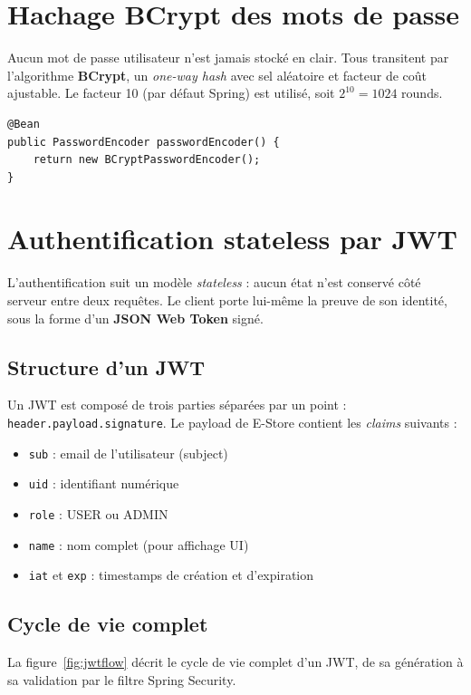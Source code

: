 \documentclass[11pt,a4paper,oneside]{report}
\begin{document}
\section{Hachage BCrypt des mots de passe}

Aucun mot de passe utilisateur n'est jamais stocké en clair. Tous transitent
par l'algorithme \textbf{BCrypt}, un \textit{one-way hash} avec sel
aléatoire et facteur de coût ajustable. Le facteur 10 (par défaut Spring)
est utilisé, soit $2^{10} = 1024$ rounds.

\begin{lstlisting}[style=javastyle]
@Bean
public PasswordEncoder passwordEncoder() {
    return new BCryptPasswordEncoder();
}
\end{lstlisting}

\section{Authentification stateless par JWT}

L'authentification suit un modèle \textit{stateless} : aucun état n'est
conservé côté serveur entre deux requêtes. Le client porte lui-même la
preuve de son identité, sous la forme d'un \textbf{JSON Web Token} signé.

\subsection{Structure d'un JWT}
Un JWT est composé de trois parties séparées par un point :
\texttt{header.payload.signature}. Le payload de E-Store contient les
\textit{claims} suivants :

\begin{itemize}
  \item \texttt{sub} : email de l'utilisateur (subject)
  \item \texttt{uid} : identifiant numérique
  \item \texttt{role} : USER ou ADMIN
  \item \texttt{name} : nom complet (pour affichage UI)
  \item \texttt{iat} et \texttt{exp} : timestamps de création et d'expiration
\end{itemize}

\subsection{Cycle de vie complet}

La figure~\ref{fig:jwtflow} décrit le cycle de vie complet d'un JWT, de
sa génération à sa validation par le filtre Spring Security.
\end{document}
